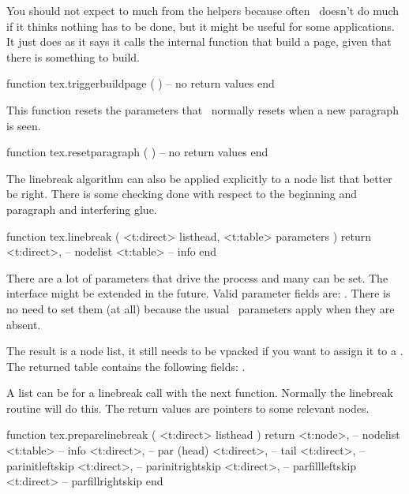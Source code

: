\stopsubsection

\startsubsection[title=Processing]

You should not expect to much from the  helpers because
often \TEX\ doesn't do much if it thinks nothing has to be done, but it might be
useful for some applications. It just does as it says it calls the internal
function that build a page, given that there is something to build.

\starttyping[option=LUA]
function tex.triggerbuildpage ( )
    -- no return values
end
\stoptyping

This function resets the parameters that \TEX\ normally resets when a new paragraph
is seen.

\starttyping[option=LUA]
function tex.resetparagraph ( )
    -- no return values
end
\stoptyping

The linebreak algorithm can also be applied explicitly to a node list that better
be right. There is some checking done with respect to the beginning and paragraph
and interfering glue.

\starttyping[option=LUA]
function tex.linebreak (
    <t:direct> listhead,
    <t:table>  parameters
)
    return
        <t:direct>, -- nodelist
        <t:table>   -- info
end
\stoptyping

There are a lot of parameters that drive the process and many can be set. The
interface might be extended in the future. Valid parameter fields are:
. There is no need to set
them (at all) because the usual \TEX\ parameters apply when they are absent.

The result is a node list, it still needs to be vpacked if you want to assign it
to a \type {\vbox}. The returned  table contains the following fields:
.

A list can be  for a linebreak call with the next function.
Normally the linebreak routine will do this. The return values are pointers to
some relevant nodes.

\starttyping[option=LUA]
function tex.preparelinebreak (
    <t:direct>  listhead
)
    return
        <t:node>, -- nodelist
        <t:table> -- info
        <t:direct>, -- par (head)
        <t:direct>, -- tail
        <t:direct>, -- parinitleftskip
        <t:direct>, -- parinitrightskip
        <t:direct>, -- parfillleftskip
        <t:direct>  -- parfillrightskip
end
\stoptyping

